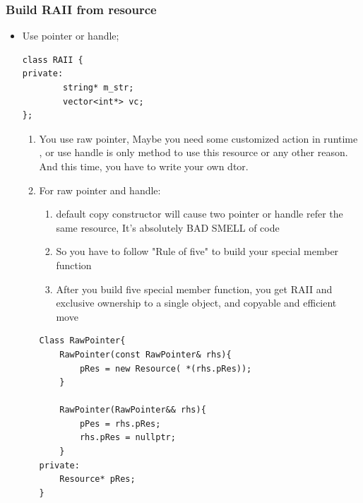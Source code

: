 \documentclass[a4paper,11pt,twoside]{book}
\begin{document}
\subsubsection{Build RAII from resource}
\begin{itemize}
		\item Use pointer or handle; 
\begin{lstlisting}[numbers=none]
class RAII {
private:
		string* m_str;
		vector<int*> vc;
};
\end{lstlisting}
			\begin{enumerate}
				\item You use raw pointer, Maybe you need some customized action in runtime , or use handle is only method to use this resource or any other reason. And this time, you have to write your own dtor.
				
				\item For raw pointer and handle: 
				\begin{enumerate}
					\item default copy constructor will cause two pointer or handle refer the same resource, It's absolutely BAD SMELL of code
					\item So you have to follow "Rule of five" to build your special member function
					\item After you build five special member function, you get RAII and exclusive ownership to a single object, and copyable and efficient move
				\end{enumerate}
			
\begin{lstlisting}[numbers=none]
Class RawPointer{
	RawPointer(const RawPointer& rhs){
		pRes = new Resource( *(rhs.pRes));
	}
				
	RawPointer(RawPointer&& rhs){
		pPes = rhs.pRes;
		rhs.pRes = nullptr;
	}
private:
	Resource* pRes;
}
\end{lstlisting}
			\end{enumerate}

\end{itemize}
\end{document}

